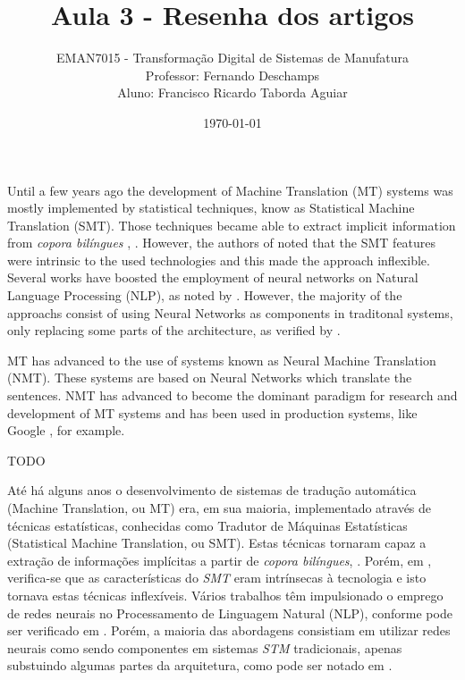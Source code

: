 \documentclass[a4paper]{article}
\title{
    Aula 3 - Resenha dos artigos\\
}
\author{
    {EMAN7015 - Transforma\c c\~ao Digital de Sistemas de Manufatura}\\
    \small{Professor: Fernando Deschamps}\\
    \small{Aluno: Francisco Ricardo Taborda Aguiar}\\    
}
\date{\today}
\begin{document}
    \maketitle

    Until a few years ago the development of Machine Translation (MT) 
    systems was mostly implemented by statistical techniques, know as 
    Statistical Machine Translation (SMT).
    Those techniques became able to extract implicit information from
    \emph{copora bil\'ingues} , \cite{brown:1993}.
    However, the authors of \cite{maruf:2021} noted that the SMT features
    were intrinsic to the used technologies and this made the approach
    inflexible. Several works have boosted the employment of neural 
    networks on Natural Language Processing (NLP), as noted by 
    \textcite{goldberg:2016}.
    However, the majority of the approachs consist of using Neural Networks
    as components in traditonal systems, only replacing some parts of the
    architecture, as verified by \textcite{stahlberg:2020}.

    MT has advanced to the use of systems known as 
    Neural Machine Translation (NMT). These systems are based on Neural 
    Networks which translate the sentences.
    NMT has advanced to become the dominant paradigm for research and 
    development of  MT systems and has been used in production systems,
    like Google \cite{wu:2016}, for example.

    TODO

    At\'e h\'a alguns anos o desenvolvimento de sistemas de tradu\c c\~ao autom\'atica 
    (Machine Translation, ou MT) era, em sua maioria, implementado atrav\'es de t\'ecnicas 
    estat\'isticas, conhecidas como Tradutor de M\'aquinas Estat\'isticas 
    (Statistical Machine Translation, ou SMT).
    Estas t\'ecnicas tornaram capaz a extra\c c\~ao de informa\c c\~oes impl\'icitas a partir de
    \emph{copora bil\'ingues}, \cite{brown:1993}. Por\'em, em \textcite{maruf:2021}, verifica-se que 
    as caracter\'isticas do \emph{SMT} eram intr\'insecas \`a tecnologia e isto tornava estas 
    t\'ecnicas inflex\'iveis. V\'arios trabalhos t\^em impulsionado o emprego de redes 
    neurais no Processamento de Linguagem Natural (NLP), conforme pode ser verificado em 
    \textcite{goldberg:2016}. Por\'em, a maioria das abordagens consistiam em utilizar redes neurais 
    como sendo componentes em sistemas \emph{STM} tradicionais, apenas substuindo algumas 
    partes da arquitetura, como pode ser notado em \textcite{stahlberg:2020}.
    
\end{document}
